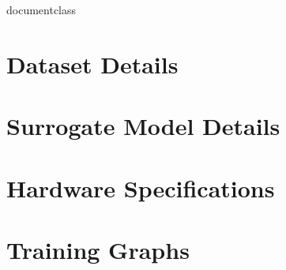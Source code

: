 \csname documentclass

\appendix
\chapter{Dataset Details}\label{appendix:datasets}

\chapter{Surrogate Model Details}

\chapter{Hardware Specifications}

\chapter{Training Graphs}
